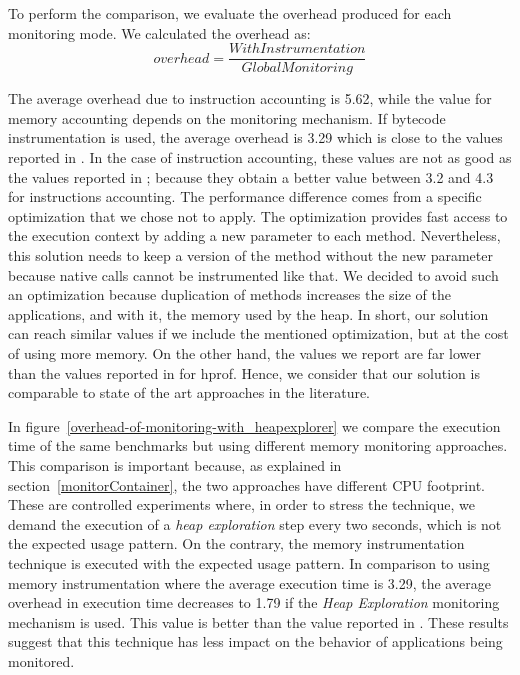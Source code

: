 To perform the comparison, we evaluate the overhead produced for each monitoring mode. We calculated the overhead as: \[overhead=\frac{WithInstrumentation}{GlobalMonitoring}\]

The average overhead due to instruction accounting is 5.62, while the value for memory accounting depends on the monitoring mechanism.
If bytecode instrumentation is used, the average overhead is 3.29 which is close to the values reported in \cite{Binder:2009:PPV:1464245.1464249}.
In the case of instruction accounting, these values are not as good as the values reported in \cite{Binder:2009:PPV:1464245.1464249}; because they obtain a better value between 3.2 and 4.3 for instructions accounting.
The performance difference comes from a specific optimization that we chose not to apply.
The optimization provides fast access to the execution context by adding a new parameter to each method.
Nevertheless, this solution needs to keep a version of the method without the new parameter because native calls cannot be instrumented like that. 
We decided to avoid such an optimization because duplication of methods increases the size of the applications, and with it, the memory used by the heap.
In short, our solution can reach similar values if we include the mentioned optimization, but at the cost of using more memory.
On the other hand, the values we report are far lower than the values reported in \cite{Binder:2009:PPV:1464245.1464249} for hprof.
Hence, we consider that our solution is comparable to state of the art approaches in the literature.

In figure~\ref{overhead-of-monitoring-with_heapexplorer} we compare the execution time of the same benchmarks but using different memory monitoring approaches.
This comparison is important because, as explained in section~\ref{monitorContainer}, the two approaches have different CPU footprint.
These are controlled experiments where, in order to stress the technique, we demand the execution of a \textit{heap exploration} step every two seconds, which is not the expected usage pattern.
On the contrary, the memory instrumentation technique is executed with the expected usage pattern.
In comparison to using memory instrumentation where the average execution time is 3.29, the average overhead in execution time  decreases to 1.79 if the \textit{Heap Exploration} monitoring mechanism is used.
This value is better than the value reported in \cite{Binder:2009:PPV:1464245.1464249}.
These results suggest that this technique has less impact on the behavior of applications being monitored.

